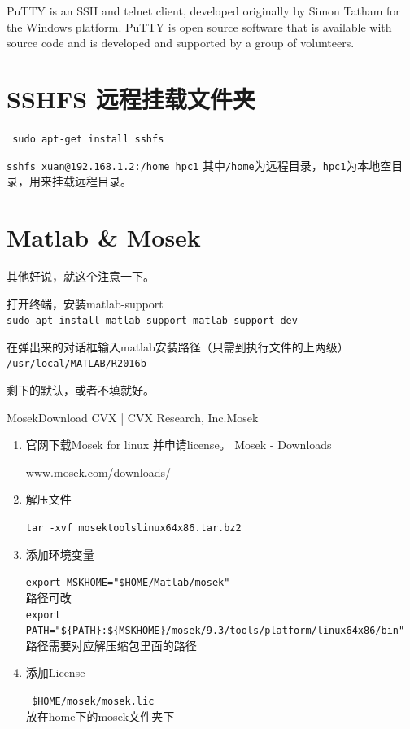 {PuTTY is an SSH and telnet client, developed originally by Simon Tatham for the Windows platform. PuTTY is open source software that is available with source code and is developed and supported by a group of volunteers.


\section{SSHFS 远程挂载文件夹}
\verb| sudo apt-get install sshfs|

\verb*|sshfs xuan@192.168.1.2:/home hpc1|
其中\verb|/home|为远程目录，\verb|hpc1|为本地空目录，用来挂载远程目录。



\section{Matlab \& Mosek}
其他好说，就这个注意一下。

打开终端，安装matlab-support\\
\verb|sudo apt install matlab-support matlab-support-dev|

在弹出来的对话框输入matlab安装路径（只需到执行文件的上两级）\\
\verb|/usr/local/MATLAB/R2016b|

剩下的默认，或者不填就好。



MosekDownload CVX | CVX Research, Inc.Mosek
\begin{enumerate}
\item 官网下载Mosek for linux 并申请license。
Mosek - Downloads

​www.mosek.com/downloads/

\item 解压文件

\verb|tar -xvf mosektoolslinux64x86.tar.bz2|

\item 添加环境变量

\verb|export MSKHOME="$HOME/Matlab/mosek" |\\
路径可改\\
\verb|export PATH="${PATH}:${MSKHOME}/mosek/9.3/tools/platform/linux64x86/bin" |\\
路径需要对应解压缩包里面的路径

\item 添加License

\verb| $HOME/mosek/mosek.lic |
\\放在home下的mosek文件夹下


\end{enumerate}}
